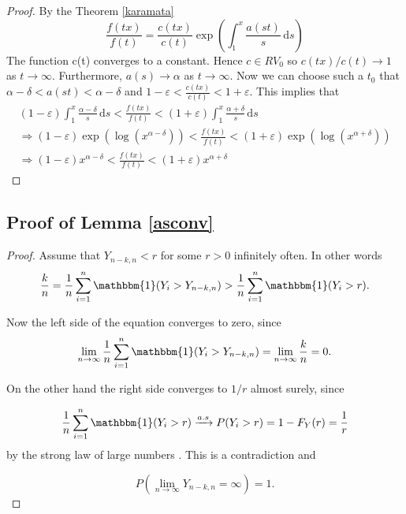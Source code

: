 \documentclass[english,12pt,a4paper,pdftex,sci,utf8]{aaltothesis} %
\begin{document}
\begin{proof}
By the Theorem \ref{karamata}
\begin{equation*}
\frac{f(tx)}{f(t)}=\frac{c(tx)}{c(t)}\exp \left(\int_1^x \frac{a(st)}{s}\,\mathrm{d}s \right)
\end{equation*}
The function c(t) converges to a constant. Hence $c \in RV_0$ so $c(tx)/c(t)\rightarrow 1$ as $t \rightarrow \infty$. Furthermore, $a(s) \rightarrow \alpha$ as $t \rightarrow \infty$. Now we can choose such a $t_0$ that $\alpha-\delta<a(st)<\alpha-\delta$ and $1-\varepsilon<\frac{c(tx)}{c(t)}<1+\varepsilon$. This implies that
\begin{equation*}
\begin{split}
(1-\varepsilon)\int_1^x \frac{\alpha-\delta}{s}\,\mathrm{d}s<\frac{f(tx)}{f(t)}<(1+\varepsilon)\int_1^x \frac{\alpha+\delta}{s}\,\mathrm{d}s \\
\Rightarrow (1-\varepsilon)\exp \left( \log \left( x^{\alpha-\delta} \right) \right)<\frac{f(tx)}{f(t)}<(1+\varepsilon)\exp \left( \log \left( x^{\alpha+\delta} \right) \right) \\
\Rightarrow (1-\varepsilon)x^{\alpha-\delta}<\frac{f(tx)}{f(t)}<(1+\varepsilon)x^{\alpha+\delta}
\end{split}
\end{equation*}
\end{proof}


\subsection{Proof of Lemma \ref{asconv}}

\begin{proof}
Assume that $Y_{n-k,n} < r$ for some $r > 0$ infinitely often. In other words
\begin{equation*}
\frac{k}{n} = \frac{1}{n} \sum_{i=1}^{n} \mathbbm{1}(Y_i>Y_{n-k,n}) > \frac{1}{n} \sum_{i=1}^{n} \mathbbm{1}(Y_i>r).
\end{equation*}

Now the left side of the equation converges to zero, since
\begin{equation*}
\lim_{n\to\infty} \frac{1}{n} \sum_{i=1}^{n} \mathbbm{1}(Y_i>Y_{n-k,n}) = \lim_{n\to\infty} \frac{k}{n} =0.
\end{equation*}

On the other hand the right side converges to $1/r$ almost surely, since

\begin{equation*}
\frac{1}{n} \sum_{i=1}^{n} \mathbbm{1}(Y_i>r) \xrightarrow{a.s} P(Y_i>r) = 1-F_Y(r) = \frac{1}{r}
\end{equation*}
by the strong law of large numbers \cite{rosenthal}. This is a contradiction and 

\begin{equation*}
P(\lim_{n\to\infty} Y_{n-k,n} = \infty)=1.
\end{equation*}
\end{proof}
\end{document}
